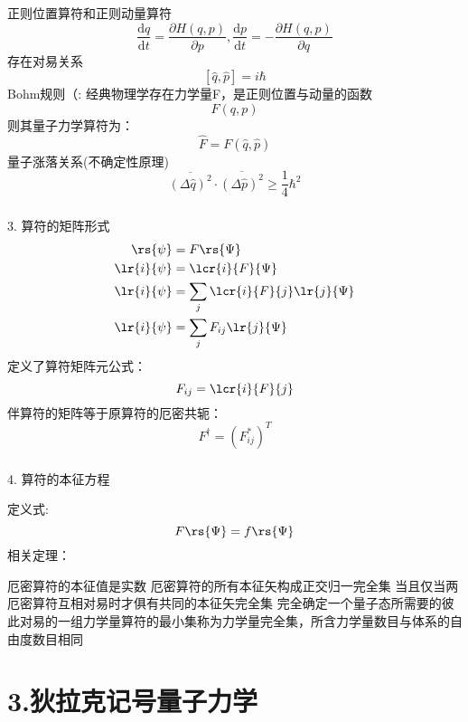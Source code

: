\begin{frame}
    \frametitle{}     
{\Bullet}正则位置算符和正则动量算符
  \[ \frac{\mathrm{d }q}{\mathrm{d }t} = \frac{\partial H(q,p) }{\partial p}, \frac{\mathrm{d }p}{\mathrm{d }t} = -\frac{ \partial H(q,p) }{\partial q} \]
  存在对易关系
  \[ [\hat{q},\hat{p}]=i\hbar\]
  \alert{Bohm规则（:} 经典物理学存在力学量F，是正则位置与动量的函数
  \[F(q,p)\]
  则其量子力学算符为：
  \[\hat{F}=F(\hat{q},\hat{p})\]
  量子涨落关系(不确定性原理) \[\overline{(\Delta \hat{q})^2} \cdot \overline{(\Delta \hat{p})^2} \geq  \frac{1}{4} \hbar ^2 \]
\end{frame} 

\begin{frame}
    \frametitle{}
    3. 算符的矩阵形式
    \[\begin{aligned}
        \rs{\psi}&=F \rs{\Psi} \\
        \lr{i}{\psi}&= \lcr{i}{F}{\Psi} \\
        \lr{i}{\psi}&= \sum_j\lcr{i}{F}{j}\lr{j}{\Psi} \\
        \lr{i}{\psi}&= \sum_j F_{ij}\lr{j}{\Psi}
    \end{aligned}\]  
    定义了算符矩阵元公式：\[ F_{ij}=\lcr{i}{F}{j}\]
    伴算符的矩阵等于原算符的厄密共轭：\[ F^{\dagger}=(F_{ij} ^*)^T\]
\end{frame}

\begin{frame}
    \frametitle{}
    4. 算符的本征方程
    \begin{itemize}
        \Item 定义式: \[F \rs{\Psi}=f\rs{\Psi}\]
        \Item 相关定理：
        \begin{itemize}
            \IItem 厄密算符的本征值是实数
            \IItem 厄密算符的所有本征矢构成正交归一完全集
            \IItem 当且仅当两厄密算符互相对易时才俱有共同的本征矢完全集
            \IItem 完全确定一个量子态所需要的彼此对易的一组力学量算符的最小集称为力学量完全集，所含力学量数目与体系的自由度数目相同
            \end{itemize}
    \end{itemize}
\end{frame}

\section{3.狄拉克记号量子力学}

